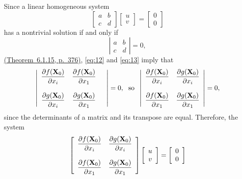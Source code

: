 \documentclass{article}
\newcommand{\dst}{\displaystyle}
\begin{document}
Since a linear homogeneous system
$$
\left[\begin{array}{ccccccc} a&b\\c&d
\end{array}\right] \left[\begin{array}{ccccccc} u\\v \end{array}\right]=
\left[\begin{array}{ccccccc} 0\\0 \end{array}\right]
 $$
has a nontrivial
solution if and only if
$$ \left|\begin{array}{ccccccc} a&b\\c&d
\end{array}\right|=0,
 $$
\href{http://ramanujan.math.trinity.edu/wtrench/texts/TRENCH_REAL_ANALYSIS.PDF}
{(Theorem~6.1.15, p.~376)},
 \eqref{eq:12} and
\eqref{eq:13} imply that
$$
\left|\begin{array}{ccccccc}
\dst{\frac{{\partial f({\bf X}_{0})}}{{\partial x_{i}}}}&
\dst{\frac{{\partial f({\bf X}_{0})}}{{\partial x_{1}}}}\\\\
\dst{\frac{{\partial g({\bf X}_{0})}}{{\partial x_{i}}}}&
\dst{\frac{{\partial g({\bf X}_{0})}}{{\partial x_{1}}}}&
\end{array}\right|=0,\text{\; so\;\;} \left|\begin{array}{ccccccc}
\dst{\frac{{\partial f({\bf X}_{0})}}{{\partial x_{i}}}}&
\dst{\frac{{\partial g({\bf X}_{0})}}{{\partial x_{i}}}}\\\\
\dst{\frac{{\partial f({\bf X}_{0})}}{{\partial x_{1}}}}&
\dst{\frac{{\partial g({\bf X}_{0})}}{{\partial x_{1}}}}
\end{array}\right|=0, $$
since the determinants of a matrix and its transpose are equal.
 Therefore, the system
$$
 \left[\begin{array}{ccccccc}
\dst{\frac{{\partial f({\bf X}_{0})}}{{\partial x_{i}}}}&
\dst{\frac{{\partial g({\bf X}_{0})}}{{\partial x_{i}}}}\\\\
\dst{\frac{{\partial f({\bf X}_{0})}}{{\partial x_{1}}}}&
\dst{\frac{{\partial g({\bf X}_{0})}}{{\partial x_{1}}}} \end{array}\right]
\left[\begin{array}{ccccccc} u\\v \end{array}\right]=
\left[\begin{array}{ccccccc} 0\\0 \end{array}\right] $$
\end{document}
